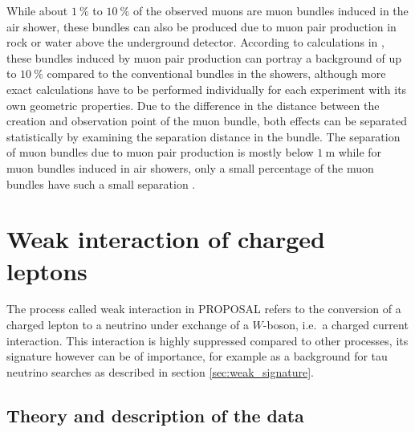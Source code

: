 While about $\SI{1}{\percent}$ to $\SI{10}{\percent}$ of the observed muons are muon bundles induced in the air shower, these bundles can also be produced due to muon pair production in rock or water above the underground detector.
According to calculations in \cite{MupairInRock}, these bundles induced by muon pair production can portray a background of up to $\SI{10}{\percent}$ compared to the conventional bundles in the showers, although more exact calculations have to be performed individually for each experiment with its own geometric properties.
Due to the difference in the distance between the creation and observation point of the muon bundle, both effects can be separated statistically by examining the separation distance in the bundle.
The separation of muon bundles due to muon pair production is mostly below $\SI{1}{\metre}$ while for muon bundles induced in air showers, only a small percentage of the muon bundles have such a small separation \cite{MupairInRock}.

\section{Weak interaction of charged leptons}

The process called weak interaction in PROPOSAL refers to the conversion of a charged lepton to a neutrino under exchange of a $W$-boson, i.e.\ a charged current interaction.
This interaction is highly suppressed compared to other processes, its signature however can be of importance, for example as a background for tau neutrino searches as described in section \ref{sec:weak_signature}.

\subsection{Theory and description of the data}
\label{sec:weak_theory}

